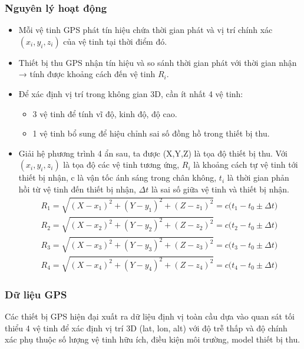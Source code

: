 \subsubsection{Nguyên lý hoạt động}
\begin{itemize}
    \item Mỗi vệ tinh GPS phát tín hiệu chứa thời gian phát và vị trí chính xác $(x_i,y_i,z_i)$ của vệ tinh tại thời điểm đó. 
    \item Thiết bị thu GPS nhận tín hiệu và so sánh thời gian phát với thời gian nhận → tính được khoảng cách đến vệ tinh $R_i$.
    \item Để xác định vị trí trong không gian 3D, cần ít nhất 4 vệ tinh:
    \begin{itemize}
        \item 3 vệ tinh để tính vĩ độ, kinh độ, độ cao.
        \item 1 vệ tinh bổ sung để hiệu chỉnh sai số đồng hồ trong thiết bị thu.
    \end{itemize}
\item Giải hệ phương trình 4 ẩn sau, ta được (X,Y,Z) là tọa độ thiết bị thu. Với $(x_i,y_i,z_i)$ là tọa độ các vệ tinh tương ứng, $R_i$ là khoảng cách tự vệ tinh tới thiết bị nhận, c là vận tốc ánh sáng trong chân không, $t_i$ là thời gian phản hồi từ vệ tinh đến thiết bị nhận, $\Delta t$ là sai số giữa vệ tinh và thiết bị nhận.
    \begin{align}
 R_{1} = \sqrt{(X - x_{1})^{2} + (Y - y_{1})^{2} + (Z - z_{1})^{2}} = c \bigl( t_{1} - t_{0} \pm \Delta t \bigr) \
\\
R_{2} = \sqrt{(X - x_{2})^{2} + (Y - y_{2})^{2} + (Z - z_{2})^{2}} 
      = c \bigl( t_{2} - t_{0} \pm \Delta t \bigr) \
\\
R_{3} = \sqrt{(X - x_{3})^{2} + (Y - y_{3})^{2} + (Z - z_{3})^{2}} 
      = c \bigl( t_{3} - t_{0} \pm \Delta t \bigr) \
\\
R_{4} = \sqrt{(X - x_{4})^{2} + (Y - y_{4})^{2} + (Z - z_{4})^{2}} 
      = c \bigl( t_{4} - t_{0} \pm \Delta t \bigr)
    \end{align}

    

\end{itemize}
\subsubsection{Dữ liệu GPS}
Các thiết bị GPS hiện đại xuất ra dữ liệu định vị toàn cầu dựa vào quan sát tối thiểu 4 vệ tinh để xác định vị trí 3D (lat, lon, alt) với độ trễ thấp và độ chính xác phụ thuộc số lượng vệ tinh hữu ích, điều kiện môi trường, model thiết bị thu.


